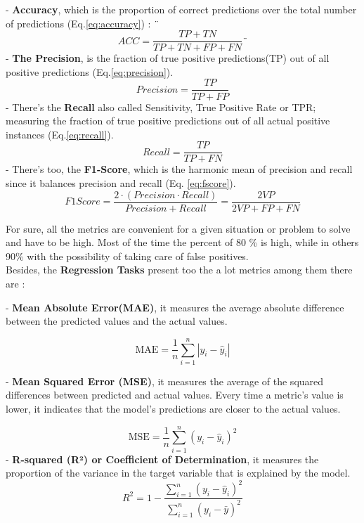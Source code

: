 \documentclass[12pt,a4paper]{report}
\begin{document}
- \textbf{Accuracy}, which is the proportion of correct predictions over the total number of predictions (Eq.\ref{eq:accuracy}) : 
¨
\begin{equation} 
\label{eq:accuracy}
	ACC = \frac{TP+TN}{TP+TN+FP+FN} 
¨\end{equation} 
- \textbf{The Precision}, is the fraction of true positive predictions(TP) out of all positive predictions (Eq.\ref{eq:precision}). 
\begin{equation}
	\label{eq:precision} 
	Precision = \frac{TP}{TP+FP}
\end{equation}  
- There's the \textbf{Recall} also called Sensitivity, True Positive Rate or TPR; measuring the fraction of true positive predictions out of all actual positive instances (Eq.\ref{eq:recall}). 
\begin{equation}
	\label{eq:recall}  
	Recall = \frac{TP}{TP+FN}
\end{equation} 
- There's too, the \textbf{F1-Score}, which is the harmonic mean of precision and recall since it balances precision and recall (Eq. \ref{eq:fscore}). 
\begin{equation}
\label{eq:fscore}
F1Score = \frac{2 \cdot (Precision \cdot Recall)}{Precision + Recall} = \frac{2VP}{2VP + FP + FN}
\end{equation}

For sure, all the metrics are convenient for a given situation or problem to solve and have to be high. Most of the time the percent of 80 \% is high, while in others 90\% with the possibility of taking care of false positives.  \\

Besides, the \textbf{Regression Tasks} present too the a lot metrics among them there are \cite{coursAnalyseDonne3} : 

- \textbf{Mean Absolute Error(MAE)}, it measures the average absolute difference between the predicted values and the actual values. 

\begin{equation}
	\text{MAE} = \frac{1}{n} \sum_{i=1}^{n} |y_i - \hat{y}_i|
\end{equation}

- \textbf{Mean Squared Error (MSE)}, it measures the average of the squared differences between predicted and actual values.
 Every time a metric's value is lower, it indicates that the model's predictions are closer to the actual values. 

\begin{equation}
\text{MSE} = \frac{1}{n} \sum_{i=1}^{n} (y_i - \hat{y}_i)^2
\end{equation}
- \textbf{R-squared (R²) or Coefficient of Determination}, it measures the proportion of the variance in the target variable that is explained by the model. 
\begin{equation}
	R^2 = 1 - \frac{\sum_{i=1}^{n} (y_i - \hat{y}_i)^2}{\sum_{i=1}^{n} (y_i - \bar{y})^2}
\end{equation}
\end{document}
